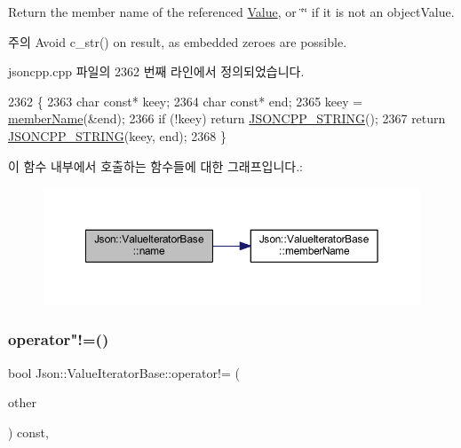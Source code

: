 Return the member name of the referenced \hyperlink{class_json_1_1_value}{Value}, or \char`\"{}\char`\"{} if it is not an object\+Value. \begin{DoxyNote}{주의}
Avoid {\ttfamily c\+\_\+str()} on result, as embedded zeroes are possible. 
\end{DoxyNote}


jsoncpp.\+cpp 파일의 2362 번째 라인에서 정의되었습니다.


\begin{DoxyCode}
2362                                              \{
2363   \textcolor{keywordtype}{char} \textcolor{keyword}{const}* keey;
2364   \textcolor{keywordtype}{char} \textcolor{keyword}{const}* end;
2365   keey = \hyperlink{class_json_1_1_value_iterator_base_a54765da6759fd3f1edcbfbaf308ec263}{memberName}(&end);
2366   \textcolor{keywordflow}{if} (!keey) \textcolor{keywordflow}{return} \hyperlink{json-forwards_8h_a1e723f95759de062585bc4a8fd3fa4be}{JSONCPP\_STRING}();
2367   \textcolor{keywordflow}{return} \hyperlink{json-forwards_8h_a1e723f95759de062585bc4a8fd3fa4be}{JSONCPP\_STRING}(keey, end);
2368 \}
\end{DoxyCode}
이 함수 내부에서 호출하는 함수들에 대한 그래프입니다.\+:
\nopagebreak
\begin{figure}[H]
\begin{center}
\leavevmode
\includegraphics[width=350pt]{class_json_1_1_value_iterator_base_a522989403c976fdbb94da846b99418db_cgraph}
\end{center}
\end{figure}
\mbox{\label{class_json_1_1_value_iterator_base_aa83bdcc8114b7d040eb8eb42eeed5f4a}} 
\subsubsection{\texorpdfstring{operator"!=()}{operator!=()}}
{\footnotesize\ttfamily bool Json\+::\+Value\+Iterator\+Base\+::operator!= (\begin{DoxyParamCaption}\item[{const \hyperlink{class_json_1_1_value_iterator_base_a9d2a940d03ea06d20d972f41a89149ee}{Self\+Type} \&}]{other }\end{DoxyParamCaption}) const\hspace{0.3cm}{\ttfamily [inline]}, {\ttfamily [inherited]}}



